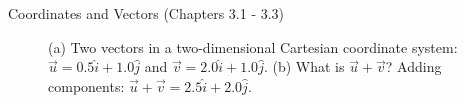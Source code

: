 \documentclass{beamer}
\begin{document}
\begin{frame}{Coordinates and Vectors (Chapters 3.1 - 3.3)}
\begin{figure}
\centering
{}
\caption{\label{fig:twovectors} (a) Two vectors in a two-dimensional Cartesian coordinate system: $\vec{u} = 0.5\hat{i}+1.0\hat{j}$ and $\vec{v} = 2.0\hat{i}+1.0\hat{j}$.  (b) What is $\vec{u}+\vec{v}$?  Adding components: $\vec{u}+\vec{v} = 2.5\hat{i}+2.0\hat{j}$.}
\end{figure}
\end{frame}
\end{document}

